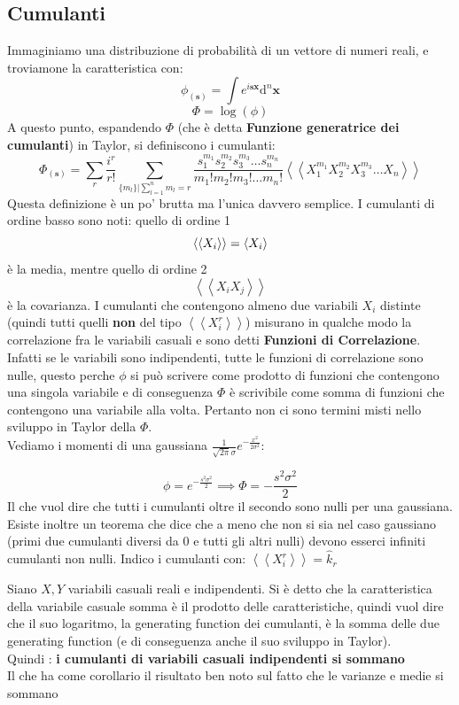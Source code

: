 \documentclass[a4paper,12pt]{article}
\renewcommand{\arg}[1]{_{(#1)}}
\theoremstyle{plain}
\renewcommand{\vec}[1]{{\boldsymbol{#1}}}
\theoremstyle{definition}
\newcommand{\f}[2]{\frac{#1}{#2}}
\renewcommand{\d}{\text{d}}
\newcommand{\pos}{\vec{x}}
\theoremstyle{remark}
\begin{document}
\subsection{Cumulanti}
Immaginiamo una distribuzione di probabilità di un vettore di numeri reali, e troviamone la caratteristica con:
\[\phi\arg{\vec{s}}=\int e^{i\vec{s}\pos}	\d^n\pos		\]
\[\Phi=\log(\phi)		\]
A questo punto, espandendo $\Phi$ (che è detta \textbf{Funzione generatrice dei cumulanti}) in Taylor, si definiscono i cumulanti:
\[\Phi\arg{\vec{s}}=\sum_r\f{i^r}{r!} \sum_{\{m_l\}|\sum_{l=1}^n m_l=r}	\f{s_1^{m_1}s_2^{m_2}s_3^{m_3}\ldots s_n^{m_n}}{m_1!m_2!m_3! 		\ldots m_n!}	\left\langle\left\langle X_1^{m_1}X_2^{m_2}X_3^{m_3}\ldots X_n\right\rangle\right\rangle\]
Questa definizione è un po' brutta ma l'unica davvero semplice. I cumulanti di ordine basso sono noti: quello di ordine 1 \[\left\langle\left\langle X_i\right\rangle\right\rangle=\expval{X_i}\] è la media, mentre quello di ordine 2 \[\left\langle\left\langle X_iX_j\right\rangle\right\rangle\]è la covarianza.
I cumulanti che contengono almeno due variabili $X_i$ distinte (quindi tutti quelli \textbf{non} del tipo $\left\langle\left\langle X_i^r\right\rangle\right\rangle$) misurano in qualche modo la correlazione fra le variabili casuali e sono detti \textbf{Funzioni di Correlazione}.
\\Infatti se le variabili sono indipendenti, tutte le funzioni di correlazione sono nulle, questo perche $\phi$ si può scrivere come prodotto di funzioni che contengono una singola variabile e di conseguenza $\Phi$ è scrivibile come somma di funzioni che contengono una variabile alla volta. Pertanto non ci sono termini misti nello sviluppo in Taylor della $\Phi$.
\\Vediamo i momenti di una gaussiana $\f{1}{\sqrt{2\pi}\sigma}e^{-\f{x^2}{2\sigma^2} }$:


\[\phi=e^{-\f{s^2\sigma^2}{2}}\implies \Phi=-\f{s^2\sigma^2}{2} \]
Il che vuol dire che tutti i cumulanti oltre il secondo sono nulli per una gaussiana.\\
Esiste inoltre un teorema che dice che a meno che non si sia nel caso gaussiano (primi due cumulanti diversi da 0 e tutti gli altri nulli) devono esserci infiniti cumulanti non nulli.
Indico i cumulanti con: $\left\langle\left\langle X_i^r\right\rangle\right\rangle=\hat{k}_r$
\begin{obs}
	Siano $X,Y$ variabili casuali reali e indipendenti. Si è detto che la caratteristica della variabile casuale somma è il prodotto delle caratteristiche, quindi vuol dire che il suo logaritmo, la generating function dei cumulanti, è la somma delle due generating function (e di conseguenza anche il suo sviluppo in Taylor).\\ Quindi : \textbf{i cumulanti di variabili casuali indipendenti si sommano}
	\\Il che ha come corollario il risultato ben noto sul fatto che le varianze e medie si sommano
	
\end{obs}
\end{document}
